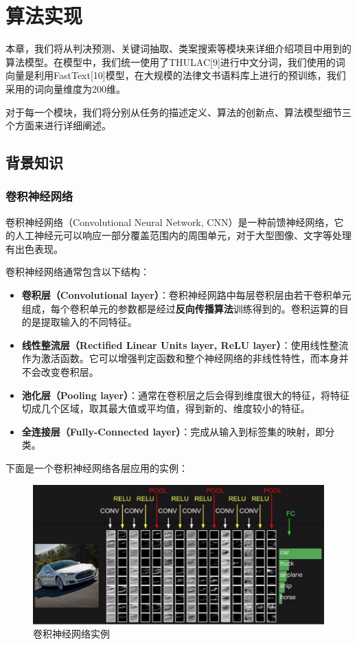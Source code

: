 \chapter{算法实现}
本章，我们将从判决预测、关键词抽取、类案搜索等模块来详细介绍项目中用到的算法模型。在模型中，我们统一使用了THULAC[9]进行中文分词，我们使用的词向量是利用FastText[10]模型，在大规模的法律文书语料库上进行的预训练，我们采用的词向量维度为200维。

对于每一个模块，我们将分别从任务的描述定义、算法的创新点、算法模型细节三个方面来进行详细阐述。

\section{背景知识}
\subsection{卷积神经网络}
卷积神经网络（Convolutional Neural Network, CNN）是一种前馈神经网络，它的人工神经元可以响应一部分覆盖范围内的周围单元，对于大型图像、文字等处理有出色表现。

卷积神经网络通常包含以下结构：

\begin{itemize}
	\item \textbf{卷积层（Convolutional layer）}：卷积神经网路中每层卷积层由若干卷积单元组成，每个卷积单元的参数都是经过\textbf{反向传播算法}训练得到的。卷积运算的目的是提取输入的不同特征。
	\item \textbf{线性整流层（Rectified Linear Units layer, ReLU layer）}：使用线性整流作为激活函数。它可以增强判定函数和整个神经网络的非线性特性，而本身并不会改变卷积层。
	\item \textbf{池化层（Pooling layer）}：通常在卷积层之后会得到维度很大的特征，将特征切成几个区域，取其最大值或平均值，得到新的、维度较小的特征。
	\item \textbf{全连接层（Fully-Connected layer）}：完成从输入到标签集的映射，即分类。
\end{itemize}

下面是一个卷积神经网络各层应用的实例：

\begin{figure}[ht]
    \centering
    \includegraphics[width=1255]{figures/cnn1}
    \caption{卷积神经网络实例}
    \label{fig:cnn1}
\end{figure}

